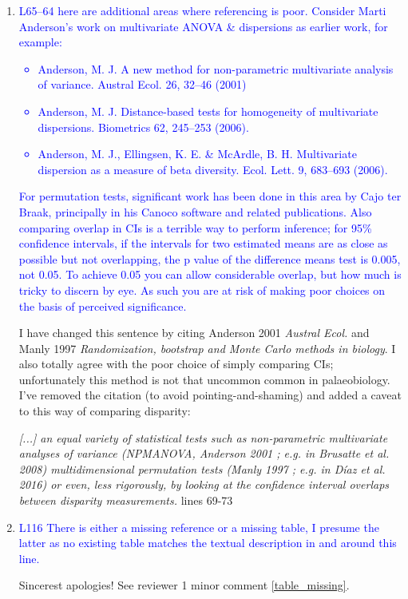 \documentclass[12pt,letterpaper]{article}
\begin{document}
\begin{enumerate}
\item{\textcolor{blue}{L65--64 here are additional areas where referencing is poor. Consider Marti Anderson's work on multivariate ANOVA \& dispersions as earlier work, for example:
\begin{itemize}
\item Anderson, M. J. A new method for non-parametric multivariate analysis of variance. Austral Ecol. 26, 32–46 (2001)
\item Anderson, M. J. Distance-based tests for homogeneity of multivariate dispersions. Biometrics 62, 245–253 (2006).
\item Anderson, M. J., Ellingsen, K. E. \& McArdle, B. H. Multivariate dispersion as a measure of beta diversity. Ecol. Lett. 9, 683–693 (2006).
\end{itemize}
}}
\textcolor{blue}{For permutation tests, significant work has been done in this area by Cajo ter Braak, principally in his Canoco software and related publications.
Also comparing overlap in CIs is a terrible way to perform inference; for 95\% confidence intervals, if the intervals for two estimated means are as close as possible but not overlapping, the p value of the difference means test is 0.005, not 0.05. To achieve 0.05 you can allow considerable overlap, but how much is tricky to discern by eye.
As such you are at risk of making poor choices on the basis of perceived significance.}

I have changed this sentence by citing Anderson 2001 \textit{Austral Ecol.} and Manly 1997 \textit{Randomization, bootstrap and Monte Carlo methods in biology}.
I also totally agree with the poor choice of simply comparing CIs; unfortunately this method is not that uncommon common in palaeobiology.
I've removed the citation (to avoid pointing-and-shaming) and added a caveat to this way of comparing disparity:

\textit{[...] an equal variety of statistical tests such as non-parametric multivariate analyses of variance (NPMANOVA, Anderson 2001 ; e.g. in Brusatte et al. 2008) multidimensional permutation tests (Manly 1997 ; e.g. in Díaz et al. 2016) or even, less rigorously, by looking at the confidence interval overlaps between disparity measurements.} lines 69-73

\item{\textcolor{blue}{L116 There is either a missing reference or a missing table, I presume the latter as no existing table matches the textual description in and around this line.}}

Sincerest apologies! See reviewer 1 minor comment \ref{table_missing}.


\end{enumerate}
\end{document}
